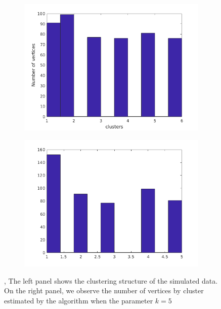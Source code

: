 \documentclass[11pt,letter]{article}%
\numberwithin{equation}{section}
\begin{document}
\begin{figure}[!h]
    \centering
    \begin{subfigure}[b]{0.45\textwidth}
            \centering
            \includegraphics[width=\textwidth]{../original_6.png}
    \label{fig:fig1}
    \end{subfigure}
\begin{subfigure}[b]{0.45\textwidth}
            \centering
            \includegraphics[width=\textwidth]{../kmis.png}
    \label{fig:fig2}
    \end{subfigure}
    \caption{\protect{}, The left panel  shows the clustering structure of the simulated data. On the  right panel, \protect{} we observe the number of vertices by cluster estimated by the algorithm when the parameter $k=5$}
\end{figure}
\end{document}
